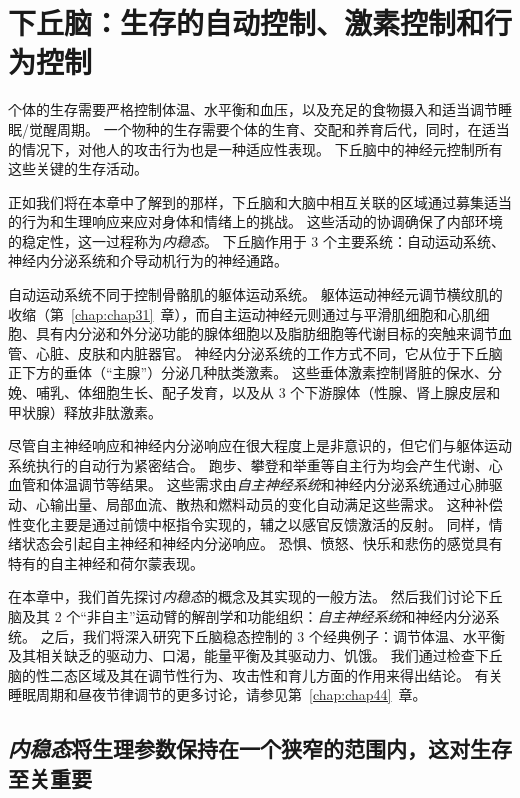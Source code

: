 \chapter{下丘脑：生存的自动控制、激素控制和行为控制} \label{chap:chap41}

个体的生存需要严格控制体温、水平衡和血压，以及充足的食物摄入和适当调节睡眠/觉醒周期。
一个物种的生存需要个体的生育、交配和养育后代，同时，在适当的情况下，对他人的攻击行为也是一种适应性表现。
下丘脑中的神经元控制所有这些关键的生存活动。


正如我们将在本章中了解到的那样，下丘脑和大脑中相互关联的区域通过募集适当的行为和生理响应来应对身体和情绪上的挑战。
这些活动的协调确保了内部环境的稳定性，这一过程称为\textit{内稳态}。
下丘脑作用于 3 个主要系统：自动运动系统、神经内分泌系统和介导动机行为的神经通路。


自动运动系统不同于控制骨骼肌的躯体运动系统。
躯体运动神经元调节横纹肌的收缩（第~\ref{chap:chap31}~章），而自主运动神经元则通过与平滑肌细胞和心肌细胞、具有内分泌和外分泌功能的腺体细胞以及脂肪细胞等代谢目标的突触来调节血管、心脏、皮肤和内脏器官。
神经内分泌系统的工作方式不同，它从位于下丘脑正下方的垂体（“主腺”）分泌几种肽类激素。
这些垂体激素控制肾脏的保水、分娩、哺乳、体细胞生长、配子发育，以及从 3 个下游腺体（性腺、肾上腺皮层和甲状腺）释放非肽激素。


尽管自主神经响应和神经内分泌响应在很大程度上是非意识的，但它们与躯体运动系统执行的自动行为紧密结合。
跑步、攀登和举重等自主行为均会产生代谢、心血管和体温调节等结果。
这些需求由\textit{自主神经系统}和神经内分泌系统通过心肺驱动、心输出量、局部血流、散热和燃料动员的变化自动满足这些需求。
这种补偿性变化主要是通过前馈中枢指令实现的，辅之以感官反馈激活的反射。
同样，情绪状态会引起自主神经和神经内分泌响应。
恐惧、愤怒、快乐和悲伤的感觉具有特有的自主神经和荷尔蒙表现。


在本章中，我们首先探讨\textit{内稳态}的概念及其实现的一般方法。
然后我们讨论下丘脑及其 2 个“非自主”运动臂的解剖学和功能组织：\textit{自主神经系统}和神经内分泌系统。
之后，我们将深入研究下丘脑稳态控制的 3 个经典例子：调节体温、水平衡及其相关缺乏的驱动力、口渴，能量平衡及其驱动力、饥饿。
我们通过检查下丘脑的性二态区域及其在调节性行为、攻击性和育儿方面的作用来得出结论。
有关睡眠周期和昼夜节律调节的更多讨论，请参见第~\ref{chap:chap44}~章。



\section{\textit{内稳态}将生理参数保持在一个狭窄的范围内，这对生存至关重要}

